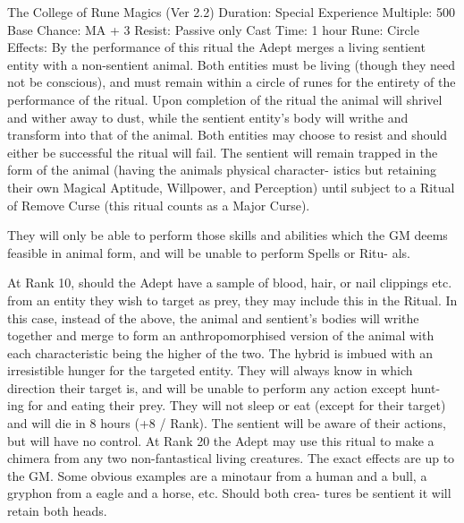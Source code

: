 \begin{Chapter}{The College of Rune Magics (Ver 2.2)}
Duration: Special 
Experience Multiple: 500 
Base Chance: MA + 3%
Resist: Passive only 
Cast Time: 1 hour  
Rune: Circle 
Effects: By the performance of this ritual the Adept 
merges  a  living  sentient  entity  with  a  non-sentient 
animal.  Both  entities  must  be  living  (though  they 
need  not  be  conscious),  and  must  remain  within  a 
circle  of  runes  for  the  entirety  of  the  performance 
of  the  ritual.  Upon  completion  of  the  ritual  the 
animal will shrivel and wither away  to dust, while 
the sentient entity’s body will writhe and transform 
into that of the animal. Both entities may choose to 
resist and should either be successful the ritual will 
fail. The sentient will remain trapped in the form of 
the animal (having the animals physical character-
istics  but  retaining  their  own  Magical  Aptitude, 
Willpower, and Perception) until subject to a Ritual 
of  Remove  Curse  (this  ritual  counts  as  a  Major 
Curse). 

They  will  only be able to perform those skills and 
abilities  which  the  GM  deems  feasible  in  animal 
form, and will be unable to perform Spells or Ritu-
als. 

At  Rank  10,  should  the  Adept  have  a  sample  of 
blood,  hair,  or  nail  clippings  etc.  from  an  entity 
they wish to target as prey, they may include this in 
the  Ritual.  In  this  case,  instead  of  the  above,  the 
animal  and  sentient’s  bodies  will  writhe  together 
and  merge  to  form  an  anthropomorphised  version 
of  the  animal  with  each  characteristic  being  the 
higher  of  the  two.  The  hybrid  is  imbued  with  an 
irresistible hunger for the targeted entity. They will 
always know in which direction their target is, and 
will  be  unable  to  perform  any  action  except  hunt-
ing for and eating their prey. They will not sleep or 
eat (except for their target) and will  die in 8 hours 
(+8  /  Rank).  The  sentient  will  be  aware  of  their 
actions,  but  will  have  no  control.  At  Rank  20  the 
Adept  may  use  this  ritual  to  make  a chimera  from 
any two non-fantastical living creatures. The exact 
effects  are up  to the  GM.  Some  obvious  examples 
are a minotaur from a human and a bull, a gryphon 
from  a  eagle  and  a  horse,  etc.  Should  both  crea-
tures be sentient it will retain both heads. 

\end{Chapter}
